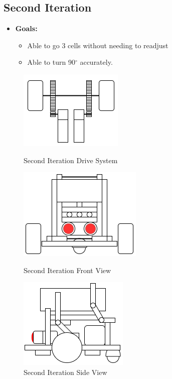 \documentclass[11pt]{article}
\begin{document}
\subsection{Second Iteration}
\begin{itemize}
\item \textbf{Goals:}
	\begin{itemize}
	\item Able to go 3 cells without needing to readjust
	\item Able to turn 90$^{\circ}$ accurately.
	\end{itemize}
\end{itemize}
\begin{figure}[htp]
\centering
\captionsetup{justification=centering}
\includegraphics[scale=0.80]{images/Hardware_Mechanical/Third_Iteration_Design_drive.png}
\caption{Second Iteration Drive System}\label{fig:Drive System}
\endminipage\hfill
{}
\includegraphics[scale=0.70]{images/Hardware_Mechanical/Third_Iteration_Design_front.png}
\caption{Second Iteration Front View}\label{fig:Front View}
\endminipage\hfill
{}
\includegraphics[scale=0.70]{images/Hardware_Mechanical/Third_Iteration_Design_side.png}
\caption{Second Iteration Side View}\label{Side View}
\endminipage
\end{figure}
\end{document}
